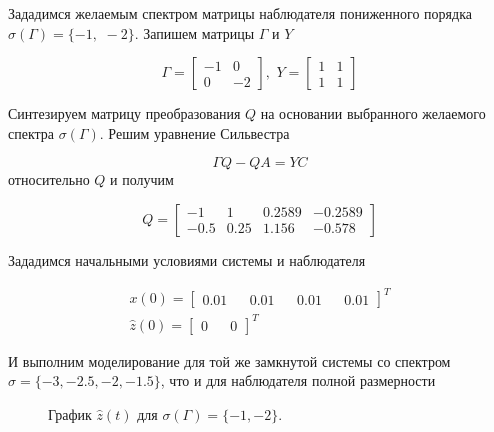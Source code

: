 Зададимся желаемым спектром матрицы наблюдателя пониженного порядка $\sigma (\Gamma) = \{ -1, \, \, -2 \}$. Запишем матрицы $\Gamma$ и $Y$

\begin{equation}
    \Gamma = \begin{bmatrix}
        -1 & 0\\
        0 & -2
    \end{bmatrix}, \, \, 
    Y = \begin{bmatrix}
        1 & 1\\
        1 & 1
    \end{bmatrix}
\end{equation}

Синтезируем матрицу преобразования $Q$ на основании выбранного желаемого спектра $\sigma (\Gamma)$. Решим уравнение Сильвестра

\begin{equation}
    \Gamma Q - Q A = YC
\end{equation}
относительно $Q$ и получим

\begin{equation}
    Q = \begin{bmatrix}
        -1&	1&	0.2589	&-0.2589\\
-0.5&	0.25&1.156&-0.578
    \end{bmatrix}
\end{equation}

Зададимся начальными условиями  системы и наблюдателя

\begin{equation}
    \begin{matrix}
        x(0) = \begin{bmatrix}
    0.01&&
    0.01&&
    0.01&&
    0.01
\end{bmatrix}^T\\
 \hat{z}(0) = \begin{bmatrix}
    0&&
    0
\end{bmatrix}^T
    \end{matrix}
\end{equation}

И выполним моделирование для той же замкнутой системы со спектром $\sigma = \{ -3, -2.5, -2, -1.5 \}$, что и для наблюдателя полной размерности

\begin{figure}[!h]
\caption{График $\hat{z}(t)$ для $ \sigma (\Gamma) = \{ -1, -2 \}$.}
\label{3_z_nlin_02_LW1}
\end{figure}

